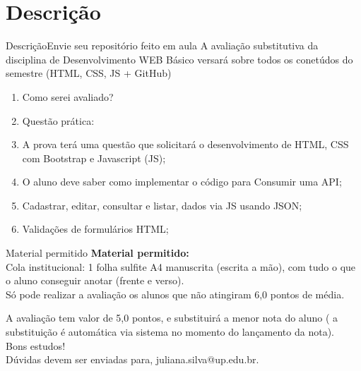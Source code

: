 \documentclass{beamer}
\begin{document}
\section{Descrição}
\begin{frame}{Descrição}{Envie seu repositório feito em aula}
A avaliação substitutiva da disciplina de Desenvolvimento WEB Básico versará sobre todos os conetúdos do semestre (HTML, CSS, JS + GitHub)
  \begin{enumerate}
      \item Como serei avaliado?
      \item Questão prática:
      \item A prova terá uma questão que solicitará o desenvolvimento de HTML, CSS com Bootstrap e Javascript (JS);
      \item O aluno deve saber como implementar o código para Consumir uma API;
      \item Cadastrar, editar, consultar e listar, dados via JS usando JSON;
      \item Validações de formulários HTML;
  \end{enumerate}

\end{frame}
\begin{frame}{Material permitido}
    \textbf{Material permitido:}\\

Cola institucional: 1 folha sulfite A4 manuscrita (escrita a mão), com tudo o que o aluno conseguir anotar (frente e verso).\\
\vspace{0,5cm}
Só pode realizar a avaliação os alunos que não atingiram 6,0 pontos de média.\\
\vspace{0,5cm}

A avaliação tem valor de 5,0 pontos, e substituirá a menor nota do aluno ( a substituição é automática via sistema no momento do lançamento da nota).\\
Bons estudos!
\\
\vspace{0,5cm}
Dúvidas devem ser enviadas para, juliana.silva@up.edu.br.
\end{frame}
\end{document}
